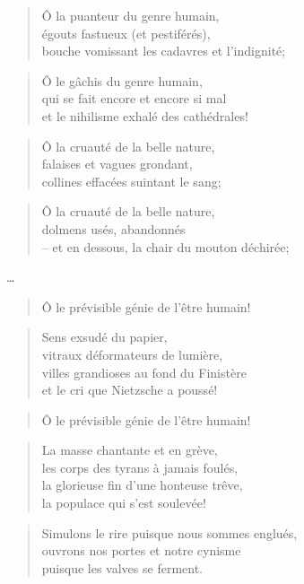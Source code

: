  \begin{verse}
    Ô la puanteur du genre humain,\\
    égouts fastueux (et pestiférés),\\
    bouche vomissant les cadavres et l’indignité;
  \end{verse}
  \begin{verse}
    Ô le gâchis du genre humain,\\
    qui se fait encore et encore si mal\\
    et le nihilisme exhalé des cathédrales!
  \end{verse}
  \begin{verse}
    Ô la cruauté de la belle nature,\\
    falaises et vagues grondant,\\
    collines effacées suintant le sang;
  \end{verse}
  \begin{verse}
    Ô la cruauté de la belle nature,\\
    dolmens usés, abandonnés\\
    -- et en dessous, la chair du mouton déchirée;
  \end{verse}
  \begin{center}
     {\huge …}
  \end{center}
  \begin{verse}
    Ô le prévisible génie de l’être humain!
  \end{verse}
  \begin{verse}
    Sens exsudé du papier,\\
    vitraux déformateurs de lumière,\\
    villes grandioses au fond du Finistère\\
    et le cri que Nietzsche a poussé!
  \end{verse}
  \begin{verse}
    Ô le prévisible génie de l’être humain!
  \end{verse}
  \begin{verse}
    La masse chantante et en grève,\\
    les corps des tyrans à jamais foulés,\\
    la glorieuse fin d’une honteuse trêve,\\
    la populace qui s’est soulevée!
  \end{verse}
  \begin{verse}
    Simulons le rire puisque nous sommes englués,\\
    ouvrons nos portes et notre cynisme\\
    puisque les valves se ferment.
  \end{verse}
